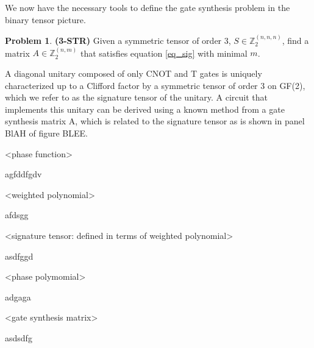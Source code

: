 \documentclass[notitlepage]{article}
\theoremstyle{definition}
\theoremstyle{problem}
\newtheorem{problem}{Problem}[section]
\theoremstyle{lemma}
\begin{document}

We now have the necessary tools to define the gate synthesis problem in the binary tensor picture.
\theoremstyle{problem}

\begin{problem}{\textbf{(3-STR)}}
	Given a symmetric tensor of order 3, $S\in \mathbb{Z}_2^{(n,n,n)}$, find a matrix $A \in \mathbb{Z}_2^{(n,m)}$ that satisfies equation \ref{eq_sig} with minimal $m$.
\end{problem}

\iffalse A diagonal unitary composed of only CNOT and T gates is uniquely characterized up to a Clifford factor by a symmetric tensor of order 3 on GF(2), which we refer to as the signature tensor of the unitary. A circuit that implements this unitary can be derived using a known method from a gate synthesis matrix A, which is related to the signature tensor as is shown in panel BlAH of figure BLEE.

<phase function>

agfddfgdv

<weighted polynomial>

afdsgg

<signature tensor: defined in terms of weighted polynomial>

asdfggd

<phase polymomial>

adgaga

<gate synthesis matrix>

asdsdfg
\end{document}

